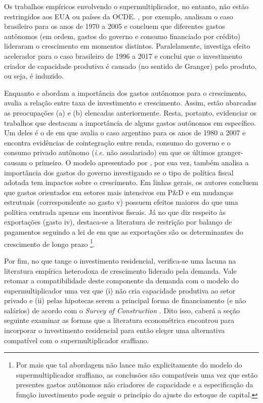 Os trabalhos empíricos envolvendo o supermultiplicador, no entanto, não estão restringidos aos EUA ou países da OCDE. \textcite{freitas_pattern_2013}, por exemplo, analisam o caso brasileiro para os anos de 1970 a 2005 e concluem que diferentes gastos autônomos (em ordem, gastos do governo e consumo financiado por crédito) lideraram o crescimento em momentos distintos. Paralelamente, \textcite{braga_investment_2018} investiga efeito acelerador para o caso brasileiro de 1996 a 2017 e conclui que o investimento criador de capacidade produtiva é causado (no sentido de Granger) pelo produto, ou seja, é induzido.  

Enquanto \textcite{freitas_pattern_2013} e \textcite{girardi_autonomous_2015} abordam a importância dos gastos autônomos para o crescimento, \textcite{braga_investment_2018} avalia a relação entre taxa de investimento e crescimento. Assim, estão abarcadas as preocupações (a) e (b) elencadas anteriormente. Resta, portanto, evidenciar os trabalhos que destacam a importância de alguns gastos autônomos em específico. Um deles é o de \textcite{medici_cointegration_2011} em que avalia o caso argentino para os anos de 1980 a 2007 e encontra evidências de cointegração entre renda, consumo do governo e o consumo privado autônomo (\textit{i.e.} não assalariado) em que os últimos granger-causam o primeiro. O modelo apresentado por \textcite{deleidi_mission-oriented_2019}, por sua vez, também analisa a importância dos gastos do governo investigando se o tipo de política fiscal adotada tem impactos sobre o crescimento. Em linhas gerais, os autores concluem que gastos orientados em setores mais intensivos em P\&D e em mudanças estrutuais (correspondente ao gasto v) possuem efeitos maiores do que uma política centrada apenas em incentivos fiscais. Já no que diz respeito às exportações (gasto iv), destaca-se a literatura de restrição por balanço de pagamentos seguindo a lei de \textcite{mccombie_balance--payments_1994} 
em que as exportações são os determinantes do crescimento de longo prazo \cites{atesoglu_balance--payments-constrained_1993}{mccombie_empirics_1997}{moreno-brid_mexicos_1999}{bertola_balance--payments-constrained_2002}\footnote{Por mais que tal abordagem não lance mão explicitamente do modelo do supermultiplicador sraffiano, as conclusões são compatíveis uma vez que estão presentes gastos autônomos não criadores de capacidade e a especificação da função investimento pode seguir o princípio do ajuste do estoque de capital.}.


Por fim, no que tange o investimento residencial, verifica-se uma lacuna na literatura empírica heterodoxa de crescimento liderado pela demanda. Vale retomar a compatibilidade deste componente da demanda com o modelo do supermultiplicador uma vez que (i) não cria   capacidade produtiva ao setor privado e (ii) pelas hipotecas serem a principal forma de financiamento (e não salários) de acordo com o \textit{Survey of Construction} \cite{us_census_bureau_characteristics_2017}. Dito isso, caberá a seção seguinte examinar as formas que a literatura econométrica encontrou para incorporar o investimento residencial para então eleger uma alternativa compatível com o supermultiplicador sraffiano.